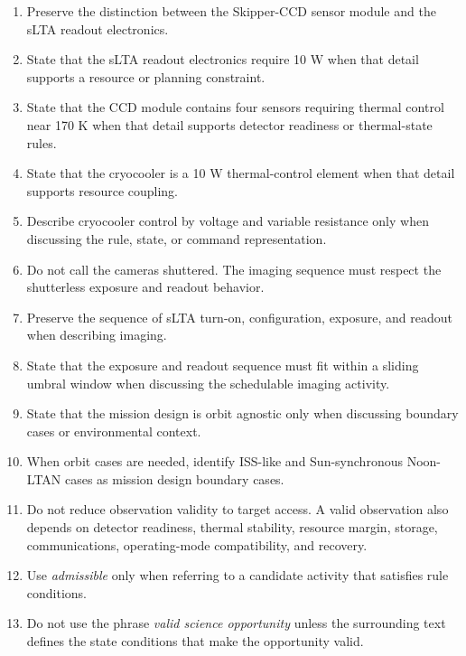 \documentclass[11pt]{article}
\begin{document}
\begin{enumerate}
\item Preserve the distinction between the Skipper-CCD sensor module and the sLTA readout electronics.

\item State that the sLTA readout electronics require 10 W when that detail supports a resource or planning constraint.

\item State that the CCD module contains four sensors requiring thermal control near 170 K when that detail supports detector readiness or thermal-state rules.

\item State that the cryocooler is a 10 W thermal-control element when that detail supports resource coupling.

\item Describe cryocooler control by voltage and variable resistance only when discussing the rule, state, or command representation.

\item Do not call the cameras shuttered. The imaging sequence must respect the shutterless exposure and readout behavior.

\item Preserve the sequence of sLTA turn-on, configuration, exposure, and readout when describing imaging.

\item State that the exposure and readout sequence must fit within a sliding umbral window when discussing the schedulable imaging activity.

\item State that the mission design is orbit agnostic only when discussing boundary cases or environmental context.

\item When orbit cases are needed, identify ISS-like and Sun-synchronous Noon-LTAN cases as mission design boundary cases.

\item Do not reduce observation validity to target access. A valid observation also depends on detector readiness, thermal stability, resource margin, storage, communications, operating-mode compatibility, and recovery.

\item Use \emph{admissible} only when referring to a candidate activity that satisfies rule conditions.

\item Do not use the phrase \emph{valid science opportunity} unless the surrounding text defines the state conditions that make the opportunity valid.


\end{enumerate}
\end{document}
